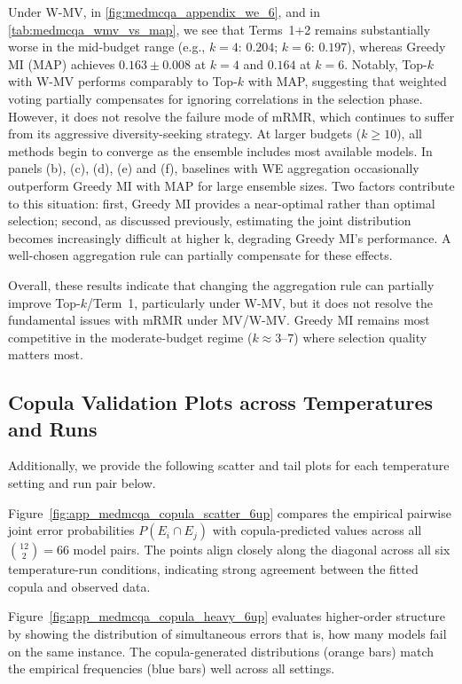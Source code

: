 \documentclass{article}
\theoremstyle{plain}
\theoremstyle{definition}
\theoremstyle{remark}
\begin{document}
Under W-MV, in \cref{fig:medmcqa_appendix_we_6}, and in \cref{tab:medmcqa_wmv_vs_map}, we see that Terms~1+2 remains substantially worse in the mid-budget range (e.g., $k=4$: $0.204$; $k=6$: $0.197$), whereas Greedy MI (MAP) achieves $0.163 \pm 0.008$ at $k=4$ and $0.164$ at $k=6$. Notably, Top-$k$ with W-MV performs comparably to Top-$k$ with MAP, suggesting that weighted voting partially compensates for ignoring correlations in the selection phase. However, it does not resolve the failure mode of mRMR, which continues to suffer from its aggressive diversity-seeking strategy. At larger budgets ($k \geq 10$), all methods begin to converge as the ensemble includes most available models. In panels (b), (c), (d), (e) and (f), baselines with WE aggregation occasionally outperform Greedy MI with MAP for large ensemble sizes. Two factors contribute to this situation: first, Greedy MI provides a near-optimal rather than optimal selection; second, as discussed previously, estimating the joint distribution becomes increasingly difficult at higher k, degrading Greedy MI's performance. A well-chosen aggregation rule can partially compensate for these effects.

Overall, these results indicate that changing the aggregation rule can partially improve Top-$k$/Term~1, particularly under W-MV, but it does not resolve the fundamental issues with mRMR under MV/W-MV. Greedy MI remains most competitive in the moderate-budget regime ($k \approx 3$--$7$) where selection quality matters most.




\newpage
\subsection{Copula Validation Plots across Temperatures and Runs}\label{app:copula_validation_medmcqa}
Additionally, we provide the following scatter and tail plots for each temperature setting and run pair below.

Figure~\ref{fig:app_medmcqa_copula_scatter_6up} compares the empirical pairwise joint error probabilities $P(E_i \cap E_j)$ with copula-predicted values across all $\binom{12}{2} = 66$ model pairs. The points align closely along the diagonal across all six temperature-run conditions, indicating strong agreement between the fitted copula and observed data.

Figure~\ref{fig:app_medmcqa_copula_heavy_6up} evaluates higher-order structure by showing the distribution of simultaneous errors that is, how many models fail on the same instance. The copula-generated distributions (orange bars) match the empirical frequencies (blue bars) well across all settings.
\end{document}
